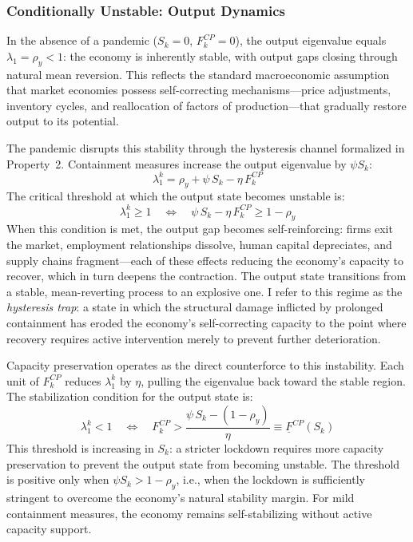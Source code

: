 \documentclass[12pt, a4paper]{article}
\begin{document}
\subsubsection{Conditionally Unstable: Output Dynamics}

In the absence of a pandemic ($S_k = 0$, $F_k^{CP} = 0$), the output eigenvalue
equals $\lambda_1 = \rho_y < 1$: the economy is inherently stable, with output gaps
closing through natural mean reversion. This reflects the standard macroeconomic
assumption that market economies possess self-correcting mechanisms---price adjustments,
inventory cycles, and reallocation of factors of production---that gradually restore
output to its potential.

The pandemic disrupts this stability through the hysteresis channel formalized in
Property~2. Containment measures increase the output eigenvalue by $\psi S_k$:
%
\begin{equation}
    \lambda_1^k = \rho_y + \psi \, S_k - \eta \, F_k^{CP}
    \label{eq:lambda1_full}
\end{equation}
%
The critical threshold at which the output state becomes unstable is:
%
\begin{equation}
    \lambda_1^k \geq 1 \quad \Longleftrightarrow \quad
    \psi \, S_k - \eta \, F_k^{CP} \geq 1 - \rho_y
    \label{eq:hysteresis_threshold}
\end{equation}
%
When this condition is met, the output gap becomes self-reinforcing: firms exit the
market, employment relationships dissolve, human capital depreciates, and supply chains
fragment---each of these effects reducing the economy's capacity to recover, which in
turn deepens the contraction. The output state transitions from a stable, mean-reverting
process to an explosive one. I refer to this regime as the \textit{hysteresis trap}: a
state in which the structural damage inflicted by prolonged containment has eroded the
economy's self-correcting capacity to the point where recovery requires active
intervention merely to prevent further deterioration.

Capacity preservation operates as the direct counterforce to this instability. Each unit
of $F_k^{CP}$ reduces $\lambda_1^k$ by $\eta$, pulling the eigenvalue back toward the
stable region. The stabilization condition for the output state is:
%
\begin{equation}
    \lambda_1^k < 1 \quad \Longleftrightarrow \quad
    F_k^{CP} > \frac{\psi \, S_k - (1 - \rho_y)}{\eta}
    \equiv \underline{F}^{CP}(S_k)
    \label{eq:CP_threshold}
\end{equation}
%
This threshold is increasing in $S_k$: a stricter lockdown requires more capacity
preservation to prevent the output state from becoming unstable. The threshold is
positive only when $\psi S_k > 1 - \rho_y$, i.e., when the lockdown is sufficiently
stringent to overcome the economy's natural stability margin. For mild containment
measures, the economy remains self-stabilizing without active capacity support.
\end{document}
